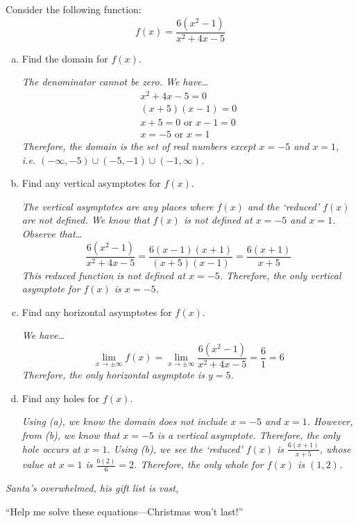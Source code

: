 \documentclass[12pt,letterpaper]{exam}
\begin{document}
\begin{questions}
Consider the following function:
	\[
	f(x)= \dfrac{6(x^2 - 1)}{x^2 + 4x - 5}
	\] \pspace
	
\begin{enumerate}[(a)]
\item Find the domain for $f(x)$. \pspace

{\itshape The denominator cannot be zero. We have\dots
	\[
	\begin{gathered}
	x^2 + 4x - 5= 0 \\
	(x + 5)(x - 1)= 0 \\
	x + 5=0 \text{ or } x - 1= 0 \\
	x= -5 \text{ or } x= 1
	\end{gathered}
	\]
Therefore, the domain is the set of real numbers except $x= -5$ and $x= 1$, i.e. $(-\infty, -5) \cup (-5, -1) \cup (-1, \infty)$.}

\item Find any vertical asymptotes for $f(x)$. \pspace

{\itshape The vertical asymptotes are any places where $f(x)$ and the `reduced' $f(x)$ are not defined. We know that $f(x)$ is not defined at $x= -5$ and $x= 1$. Observe that\dots
	\[
	\dfrac{6(x^2 - 1)}{x^2 + 4x - 5}= \dfrac{6(x - 1)(x + 1)}{(x + 5)(x - 1)}= \dfrac{6(x + 1)}{x + 5}
	\]
This reduced function is not defined at $x= -5$. Therefore, the only vertical asymptote for $f(x)$ is $x= -5$.}

\item Find any horizontal asymptotes for $f(x)$. \vfill

{\itshape We have\dots
	\[
	\lim_{x \to \pm\infty} f(x)= \lim_{x \to \pm \infty}  \dfrac{6(x^2 - 1)}{x^2 + 4x - 5}= \dfrac{6}{1}= 6
	\]
Therefore, the only horizontal asymptote is $y= 5$.
}

\item Find any holes for $f(x)$. \pspace

{\itshape Using (a), we know the domain does not include $x= -5$ and $x= 1$. However, from (b), we know that $x= -5$ is a vertical asymptote. Therefore, the only hole occurs at $x= 1$. Using (b), we see the `reduced' $f(x)$ is $\frac{6(x + 1)}{x + 5}$, whose value at $x= 1$ is $\frac{6(2)}{6}= 2$. Therefore, the only whole for $f(x)$ is $(1, 2)$.}
\end{enumerate}



\newpage
\hfill {\itshape Santa's overwhelmed, his gift list is vast, \hfill \phantom{XXXXXXXXXXX} \par
\hfill ``Help me solve these equations---Christmas won't last!''} \hfill \phantom{.} \par\vspace{0.3cm}


\end{questions}
\end{document}
